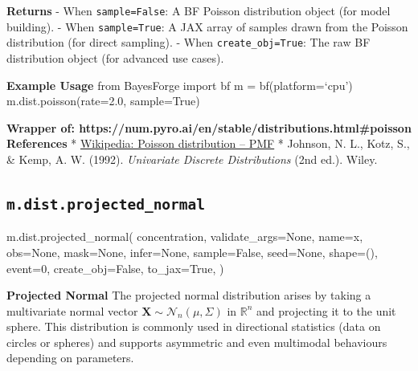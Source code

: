 \documentclass[
  letterpaper,
  DIV=11,
  numbers=noendperiod]{scrartcl}
\newenvironment{Shaded}{\begin{snugshade}}{\end{snugshade}}
\newcommand{\DecValTok}[1]{\textcolor[rgb]{0.68,0.00,0.00}{#1}}
\newcommand{\NormalTok}[1]{\textcolor[rgb]{0.00,0.23,0.31}{#1}}
\newcommand{\OperatorTok}[1]{\textcolor[rgb]{0.37,0.37,0.37}{#1}}
\newcommand{\StringTok}[1]{\textcolor[rgb]{0.13,0.47,0.30}{#1}}
\newcommand{\VariableTok}[1]{\textcolor[rgb]{0.07,0.07,0.07}{#1}}
\begin{document}
\textbf{Returns} - When \texttt{sample=False}: A BF Poisson distribution
object (for model building). - When \texttt{sample=True}: A JAX array of
samples drawn from the Poisson distribution (for direct sampling). -
When \texttt{create\_obj=True}: The raw BF distribution object (for
advanced use cases).

\textbf{Example Usage} from BayesForge import bf m = bf(platform=`cpu')
m.dist.poisson(rate=2.0, sample=True)

\textbf{Wrapper of:
https://num.pyro.ai/en/stable/distributions.html\#poisson}
\textbf{References} *
\href{https://en.wikipedia.org/wiki/Poisson_distribution\#Probability_mass_function}{Wikipedia:
Poisson distribution -- PMF} * Johnson, N. L., Kotz, S., \& Kemp, A. W.
(1992). \emph{Univariate Discrete Distributions} (2nd ed.). Wiley.

\subsection{\texorpdfstring{\texttt{m.dist.projected\_normal}}{m.dist.projected\_normal}}\label{projected_normal}

\begin{Shaded}
\begin{Highlighting}[]
\NormalTok{m.dist.projected\_normal(}
\NormalTok{    concentration,}
\NormalTok{    validate\_args}\OperatorTok{=}\VariableTok{None}\NormalTok{,}
\NormalTok{    name}\OperatorTok{=}\StringTok{\textquotesingle{}x\textquotesingle{}}\NormalTok{,}
\NormalTok{    obs}\OperatorTok{=}\VariableTok{None}\NormalTok{,}
\NormalTok{    mask}\OperatorTok{=}\VariableTok{None}\NormalTok{,}
\NormalTok{    infer}\OperatorTok{=}\VariableTok{None}\NormalTok{,}
\NormalTok{    sample}\OperatorTok{=}\VariableTok{False}\NormalTok{,}
\NormalTok{    seed}\OperatorTok{=}\VariableTok{None}\NormalTok{,}
\NormalTok{    shape}\OperatorTok{=}\NormalTok{(),}
\NormalTok{    event}\OperatorTok{=}\DecValTok{0}\NormalTok{,}
\NormalTok{    create\_obj}\OperatorTok{=}\VariableTok{False}\NormalTok{,}
\NormalTok{    to\_jax}\OperatorTok{=}\VariableTok{True}\NormalTok{,}
\NormalTok{)}
\end{Highlighting}
\end{Shaded}

\textbf{Projected Normal} The projected normal distribution arises by
taking a multivariate normal vector
\(\mathbf X \sim \mathcal N_n (\mu, \Sigma)\) in \(\mathbb R^n\) and
projecting it to the unit sphere. This distribution is commonly used in
directional statistics (data on circles or spheres) and supports
asymmetric and even multimodal behaviours depending on parameters.
\end{document}
